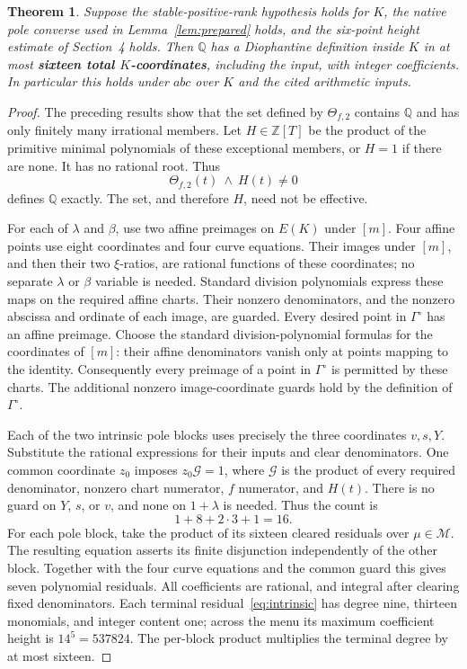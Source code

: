 \documentclass[11pt,a4paper]{article}
\newtheorem{theorem}{Theorem}[section]
\newcommand{\Q}{\mathbb Q}\newcommand{\Z}{\mathbb Z}
\begin{document}
\begin{theorem}\label{thm:sixteen}
Suppose the stable-positive-rank hypothesis holds for $K$, the native
pole converse used in Lemma~\ref{lem:prepared} holds, and the six-point
height estimate of Section~4 holds. Then $\Q$ has a Diophantine
definition inside $K$ in at most \textbf{sixteen total $K$-coordinates},
including the input, with integer coefficients. In particular this
holds under $abc$ over $K$ and the cited arithmetic inputs.
\end{theorem}
\begin{proof}
The preceding results show that the set defined by $\Theta_{f,2}$
contains $\Q$ and has only finitely many irrational members.
Let $H\in\Z[T]$ be the product of the primitive minimal polynomials
of these exceptional members, or $H=1$ if there are none. It has no
rational root. Thus
\[
                         \Theta_{f,2}(t)\ \wedge\ H(t)\ne0
\]
defines $\Q$ exactly. The set, and therefore $H$, need not be effective.

For each of $\lambda$ and $\beta$, use two affine preimages on $E(K)$
under $[m]$. Four affine points use eight coordinates and four curve
equations. Their images under $[m]$, and then their two $\xi$-ratios,
are rational functions of these coordinates; no separate $\lambda$
or $\beta$ variable is needed. Standard division polynomials express
these maps on the required affine charts. Their nonzero denominators,
and the nonzero abscissa and ordinate of each image, are guarded.
Every desired point in $\Gamma^\circ$ has an affine preimage. Choose
the standard division-polynomial formulas for the coordinates of $[m]$:
their affine denominators vanish only at points mapping to the identity.
Consequently every preimage of a point in $\Gamma^\circ$ is permitted by
these charts. The additional nonzero image-coordinate guards hold by the
definition of $\Gamma^\circ$.

Each of the two intrinsic pole blocks uses precisely the three
coordinates $v,s,Y$. Substitute the rational expressions for their
inputs and clear denominators. One common coordinate $z_0$ imposes
$z_0\mathcal G=1$, where $\mathcal G$ is the product of every required
denominator, nonzero chart numerator, $f$ numerator, and $H(t)$.
There is no guard on $Y$, $s$, or $v$, and none on $1+\lambda$ is
needed. Thus the count is
\[
              1+8+2\cdot3+1=16.
\]
For each pole block, take the product of its sixteen cleared residuals
over $\mu\in\mathcal M$. The resulting equation asserts its finite
disjunction independently of the other block. Together with the four
curve equations and the common guard this gives seven polynomial
residuals. All coefficients are rational, and integral after clearing
fixed denominators. Each terminal residual~\eqref{eq:intrinsic} has
degree nine, thirteen monomials, and integer content one; across the
menu its maximum coefficient height is $14^5=537824$. The per-block
product multiplies the terminal degree by at most sixteen.


\end{proof}
\end{document}
